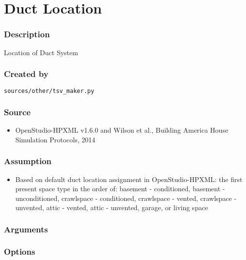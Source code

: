 \section{Duct Location}\label{duct_location}

\subsubsection{Description}\label{description-37}

Location of Duct System

\subsubsection{Created by}\label{created-by-37}

\texttt{sources/other/tsv\_maker.py}

\subsubsection{Source}\label{source-36}

\begin{itemize}
 
\item
  OpenStudio-HPXML v1.6.0 and Wilson et al., \textquotesingle Building
  America House Simulation Protocols\textquotesingle, 2014
\end{itemize}

\subsubsection{Assumption}\label{assumption-20}

\begin{itemize}
 
\item
  Based on default duct location assignment in OpenStudio-HPXML: the
  first present space type in the order of: basement - conditioned,
  basement - unconditioned, crawlspace - conditioned, crawlspace -
  vented, crawlspace - unvented, attic - vented, attic - unvented,
  garage, or living space
\end{itemize}

\subsubsection{Arguments}\label{arguments-24}



\subsubsection{Options}\label{options-37}

